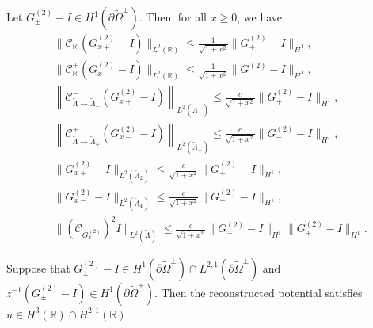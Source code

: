 \documentclass[10pt,a4paper]{amsart}
\begin{document}
\begin{lemma}\label{imlem}
Let $G^{(2)}_{\pm}-I\in H^{1}(\partial\widetilde{\Omega}^{\pm})$. Then, for all $x\geq0$, we have
\begin{align}
&\|\mathcal{C}_{\mathbb{R}}^{-}(G^{(2)}_{x+}-I)\|_{L^{2}(\mathbb{R})}\leq\frac{1}{\sqrt{1+x^{2}}}\|G^{(2)}_{+}-I\|_{H^{1}},\label{e1}\\
&\|\mathcal{C}_{\mathbb{R}}^{+}(G^{(2)}_{x-}-I)\|_{L^{2}(\mathbb{R})}\leq\frac{1}{\sqrt{1+x^{2}}}\|G^{(2)}_{-}-I\|_{H^{1}},\label{e2}\\
&\left\|\mathcal{C}_{\widetilde{\Lambda}\rightarrow\widetilde{\Lambda}_{-}}^{-}(G^{(2)}_{x+}-I)\right\|_{L^{2}(\widetilde{\Lambda}_{-})}\leq\frac{c}{\sqrt{1+x^{2}}}\|G^{(2)}_{+}-I\|_{H^{1}},\label{e3}\\
&\left\|\mathcal{C}_{\widetilde{\Lambda}\rightarrow\widetilde{\Lambda}_{+}}^{+}(G^{(2)}_{x-}-I)\right\|_{L^{2}(\widetilde{\Lambda}_{+})}\leq\frac{c}{\sqrt{1+x^{2}}}\|G^{(2)}_{-}-I\|_{H^{1}},\label{e4}\\
&\|G^{(2)}_{x+}-I\|_{L^{2}(\widetilde{\Lambda}_{2})}\leq\frac{c}{\sqrt{1+x^{2}}}\|G^{(2)}_{+}-I\|_{H^{1}},\label{e5}\\
&\|G^{(2)}_{x-}-I\|_{L^{2}(\widetilde{\Lambda}_{4})}\leq\frac{c}{\sqrt{1+x^{2}}}\|G^{(2)}_{-}-I\|_{H^{1}},\label{e6}\\
&\|(\mathcal{C}_{G^{(2)}_{x}})^{2}I\|_{L^{2}(\widetilde{\Lambda})}\leq\frac{c}{\sqrt{1+x^{2}}}\|G^{(2)}_{-}-I\|_{H^{1}}\|G^{(2)}_{+}-I\|_{H^{1}}.\label{e7}
\end{align}
\end{lemma}

\begin{proposition}\label{refa}
Suppose that $G^{(2)}_{\pm}-I\in H^{1}(\partial\widetilde{\Omega}^{\pm})\cap L^{2,1}(\partial\widetilde{\Omega}^{\pm})$
 and $z^{-1}(G^{(2)}_{\pm}-I )\in H^{1}(\partial\widetilde{\Omega}^{\pm})$.
Then the reconstructed potential satisfies $u\in H^{3}(\mathbb{R})\cap H^{2,1}(\mathbb{R})$.
\end{proposition}
\end{document}
